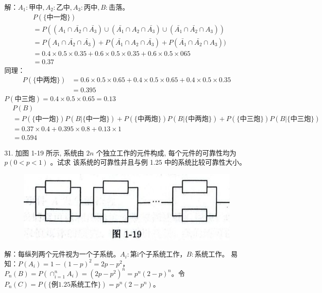 \documentclass[14pt]{scrartcl} %
\numberwithin{equation}{section} %
\numberwithin{figure}{section} %
\numberwithin{table}{section} %
\begin{document}
	\vspace*{1cm}
	解：$A_1:\text{甲中}, A_2:\text{乙中},A_3:\text{丙中},B:\text{击落}$。
	\begin{align}
		& P(\{\text{中一炮}\}) \\
		& = P((A_1 \cap \bar{A_2} \cap \bar{A_3}) \cup (\bar{A_1} \cap A_2 \cap \bar{A_3}) \cup (\bar{A_1} \cap \bar{A_2} \cap A_3)) \\
		& = P(A_1 \cap \bar{A_2} \cap \bar{A_3}) + P(\bar{A_1} \cap A_2 \cap \bar{A_3}) + P(\bar{A_1} \cap \bar{A_2} \cap A_3)) \\
		& = 0.4 \times 0.5 \times 0.35 + 0.6 \times 0.5 \times 0.35 + 0.6 \times 0.5 \times 065 \\
		& = 0.37
	\end{align}
	同理：
	\begin{align}
		P(\{\text{中两炮}\}) & = 0.6 \times 0.5 \times 0.65 + 0.4 \times 0.5 \times 0.65 + 0.4 \times 0.5 \times 0.35 \\
		& = 0.395
	\end{align}
	$P(\text{中三炮}) = 0.4 \times 0.5 \times 0.65 = 0.13$
	\begin{align}
		& P(B)  \\
		& = P(\{\text{中一炮}\})P(B | \{\text{中一炮}\}) + P(\{\text{中两炮}\})P(B | \{\text{中两炮}\}) + P(\{\text{中三炮}\})P(B | \{\text{中三炮}\}) \\
		& = 0.37 \times 0.4 + 0.395 \times 0.8 + 0.13 \times 1 \\ 
		& = 0.594
	\end{align}
	
	\vspace*{1cm}
	31. 加图 1-19 所示, 系统由 $2 n$ 个独立工作的元件构成, 每个元件的可靠性均为 $p(0<p<1)$ 。试求 该系统的可靠性并且与例 1.25 中的系统比较可靠性大小。
	\begin{figure}[H]
		\centering
		\includegraphics[scale = 0.5]{figures/figure1-19.png}
	\end{figure}
	
	\vspace*{1cm}
	解：每纵列两个元件视为一个子系统。$A_i:$第i个子系统工作，$B:$系统工作。
	易知：$P(A_i) = 1 - (1 - p) ^ 2 = 2p - p ^ 2$， $P_n(B) = P(\cap_{i = 1}^{n} A_i) = (2p - p ^ 2) ^ n = p ^ n ( 2 - p) ^ n$。令$P_n(C) = P(\{\text{例1.25系统工作}\}) = p^n(2 - p ^n)$。
	
\end{document}
